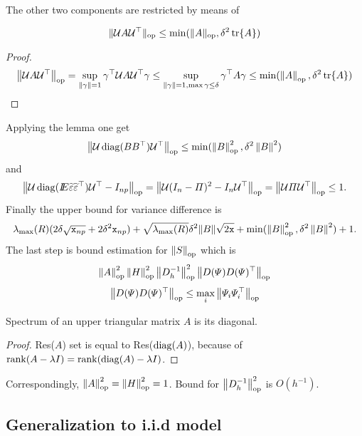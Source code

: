 The other two components are restricted by means of 
\begin{lemma}
\[
\Vert \UV A \UV^{\T} \Vert_{\oper} \leq 
\min ( \Vert A \Vert_{\oper}, \td^{2} \tr\{A\} )
\]
\end{lemma}
\begin{proof}
\[
\normop{ \UV A \UV^{\T} } 
=
\sup_{\normp{\gamma} = 1} \gamma^{\T} \UV A \UVt \gamma
 \leq 
\sup_{\normp{\gamma} = 1, \max \gamma \leq \td} \gamma^{\T}  A  \gamma
 \leq 
 \min ( \normop{A}, \td^{2} \tr\{A\} )
\] 
\end{proof}
Applying the lemma one get
\[
\normop{\UV \diag(BB^{\T})\UV^{\T}} \leq \min ( \normop{B}^2, \td^{2} \normp{B}^2 )
\]
and
\[
\normop{\UV \diag(\E \tilde{\varepsilon}\tilde{\varepsilon}^{\T}) \UV^{\T}  - I_{np}
} 
= \normop{\UV (I_{n} - \Pi)^2  - I_{n} \UVt} = \normop{\UV\Pi\UVt} \leq 1.
\]
Finally the upper bound for variance difference is  
\[
\lambda_{\max}(R) (  2 \td \sqrt{\xxnp} + 2 \td^{2} \xxnp ) + 
\sqrt{\lambda_{\max}(R)} \td^{2} \| B \| \sqrt{2 \xx}  + \min ( \normop{B}^2, \td^{2} \normp{B}^2 ) + 1.
\]
The last step is bound estimation for $\normop{S}$ which is
\[
\normop{A}^2 \normop{H}^2  \normop{D_h^{-1}}^2  \normop{\diagPsi \diagPsi^{\T}}
\]
\[
\normop{\diagPsi \diagPsi^{\T}} \leq \max_{i} \normop{\Psi_i \Psi^{\T}_i} 
\]
\begin{lemma}
Spectrum of an upper triangular matrix $A$ is its diagonal. 
\end{lemma}

\begin{proof}
Res($A$) set is equal to  Res($\diag(A)$), because of
$\rank(A - \lambda I) = \rank(\diag(A) - \lambda I)$. 
\end{proof}
Correspondingly, $\normop{A}^2 = \normop{H}^2 = 1$. Bound for   $ \normop{D_h^{-1}}^2$ is $O(h^{-1})$.

\subsection{Generalization to i.i.d model}

